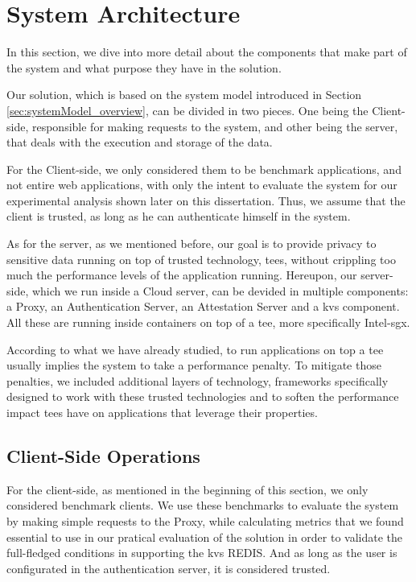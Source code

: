\section{System Architecture}
\label{sec:systemArchitecture}
In this section, we dive into more detail about the components that make part of the system and what purpose they have in the solution.  

Our solution, which is based on the system model introduced in Section \ref{sec:systemModel_overview}, can be divided in two pieces. One being the Client-side, responsible for making requests to the system, and other being the server, that deals with the execution and storage of the data.

For the Client-side, we only considered them to be benchmark applications, and not entire web applications, with only the intent to evaluate the system for our experimental analysis shown later on this dissertation. Thus, we assume that the client is trusted, as long as he can authenticate himself in the system.

As for the server, as we mentioned before, our goal is to provide privacy to sensitive data running on top of trusted technology, \gls{tee}s, without crippling too much the performance levels of the application running. 
Hereupon, our server-side, which we run inside a Cloud server, can be devided in multiple components: a Proxy, an Authentication Server, an Attestation Server and a \gls{kvs} component. All these are running inside containers on top of a \gls{tee}, more specifically Intel-\gls{sgx}.

According to what we have already studied, to run applications on top a \gls{tee} usually implies the system to take a performance penalty. To mitigate those penalties, we included additional layers of technology, frameworks specifically designed to work with these trusted technologies and to soften the performance impact \gls{tee}s have on applications that leverage their properties. 

\subsection{Client-Side Operations}

For the client-side, as mentioned in the beginning of this section, we only considered benchmark clients. We use these benchmarks to evaluate the system by making simple requests to the Proxy, while calculating metrics that we found essential to use in our pratical evaluation of the solution in order to validate the full-fledged conditions in supporting the \gls{kvs} REDIS. And as long as the user is configurated in the authentication server, it is considered trusted.

